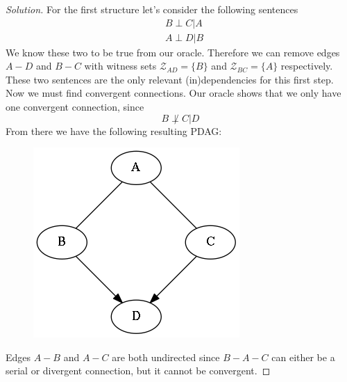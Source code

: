 \documentclass{amsart}
\theoremstyle{plain}
\newenvironment{solution}{\begin{proof}[Solution]}{\end{proof}}
\newcommand{\set}[1]{\mathcal{#1}}
\begin{document}
\begin{solution}
  For the first structure let's consider the following sentences
  \begin{align*}
    &B\perp C | A\\
    &A\perp D | B
  \end{align*}
  We know these two to be true from our oracle. Therefore we can remove edges $A-D$ and $B-C$
  with witness sets $\set{Z}_{AD}=\{B\}$ and $\set{Z}_{BC}=\{A\}$ respectively. These two sentences
  are the only relevant (in)dependencies for this first step. Now we must find convergent
  connections. Our oracle shows that we only have one convergent connection, since
  \begin{equation*}
    B\not\perp C | D
  \end{equation*}
  From there we have the following resulting PDAG\@:
  \begin{figure}[h]
    \centering\includegraphics[scale=0.3]{graphs/ex1_a.png}
  \end{figure}
  Edges $A-B$ and $A-C$ are both undirected since $B-A-C$ can either be a serial or divergent
  connection, but it cannot be convergent.


\end{solution}
\end{document}
